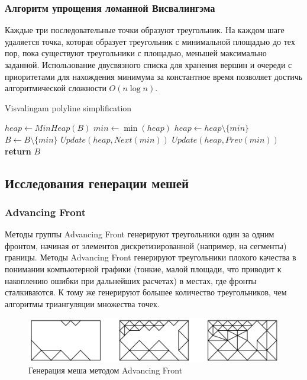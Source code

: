 \documentclass{fefu}
\newenvironment{algo}[1][]
  {\begin{algorithm}[#1]
     \selectlanguage{english}
     \floatname{algorithm}{Алгоритм}
  }
  {\end{algorithm}}
\begin{document}
\subsubsection{Алгоритм упрощения ломанной Висвалингэма}
Каждые три последовательные точки образуют треугольник. На каждом шаге удаляется точка, которая образует
треугольник с минимальной площадью до тех пор, пока существуют треугольники с площадью, меньшей максимально заданной.
Использование двусвязного списка для хранения вершин и очереди с приоритетами для нахождения минимума за константное время
позволяет достичь алгоритмической сложности $O(n\log{}n)$.
\begin{algo}[H]
    \caption{Visvalingam polyline simplification}
    \begin{algorithmic}[1]
         
            \State $heap \gets MinHeap(B)$ 
                \State $min \gets \min\left(heap\right)$
                \State $heap \gets heap \setminus \{min\}$
                    \State $B \gets B \setminus \{min\}$
                    \State $Update(heap, Next(min))$
                    \State $Update(heap, Prev(min))$
                \EndIf
            \EndWhile
            \State \textbf{return} $B$
        \EndProcedure
    \end{algorithmic}
\end{algo}
\subsection{Исследования генерации мешей}
\subsubsection{Advancing Front}
Методы группы Advancing Front\cite{AdvancingFront} генерируют треугольники один за одним фронтом, начиная от элементов
дискретизированной (например, на сегменты) границы. Методы Advancing Front генерируют треугольники плохого качества
в понимании компьютерной графики (тонкие, малой площади, что приводит к накоплению ошибки при дальнейших расчетах)
в местах, где фронты сталкиваются. К тому же генерируют большее количество треугольников, чем алгоритмы триангуляции
множества точек.
\begin{figure}[H]
    \centering
    \includegraphics[]{images/AdvancingFront.png}
    \caption{Генерация меша методом Advancing Front}
\end{figure}
\end{document}
